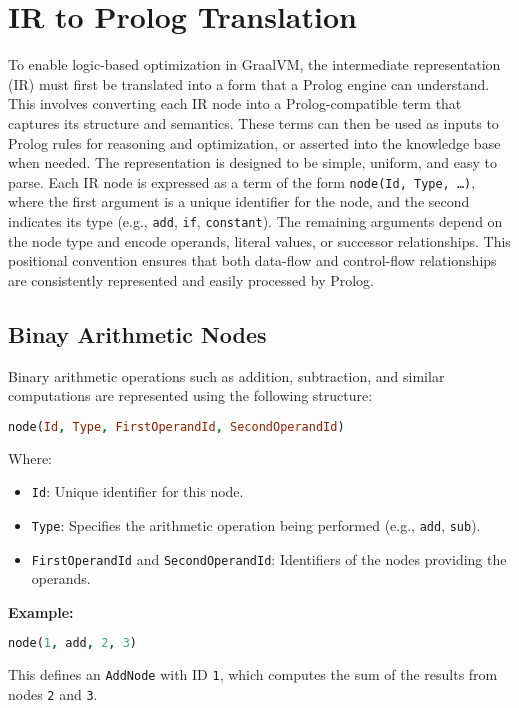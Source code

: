 \section{IR to Prolog Translation}
To enable logic-based optimization in GraalVM, the intermediate representation (IR) must first be translated into a form that a Prolog engine can understand. This involves converting each IR node into a Prolog-compatible term that captures its structure and semantics. These terms can then be used as inputs to Prolog rules for reasoning and optimization, or asserted into the knowledge base when needed.
The representation is designed to be simple, uniform, and easy to parse. Each IR node is expressed as a term of the form \texttt{node(Id, Type, \ldots)}, where the first argument is a unique identifier for the node, and the second indicates its type (e.g., \texttt{add}, \texttt{if}, \texttt{constant}). The remaining arguments depend on the node type and encode operands, literal values, or successor relationships. This positional convention ensures that both data-flow and control-flow relationships are consistently represented and easily processed by Prolog.

\subsection*{Binay Arithmetic Nodes}
Binary arithmetic operations such as addition, subtraction, and similar computations are represented using the following structure:

\begin{lstlisting}[language=Prolog]
node(Id, Type, FirstOperandId, SecondOperandId)
\end{lstlisting}

Where:
\begin{itemize}
\item \texttt{Id}: Unique identifier for this node.
\item \texttt{Type}:  Specifies the arithmetic operation being performed (e.g., \texttt{add}, \texttt{sub}).
\item \texttt{FirstOperandId} and \texttt{SecondOperandId}: Identifiers of the nodes providing the operands.
\end{itemize}

\textbf{Example:}
\begin{lstlisting}[language=Prolog]
node(1, add, 2, 3)
\end{lstlisting}
This defines an \texttt{AddNode} with ID \texttt{1}, which computes the sum of the results from nodes \texttt{2} and \texttt{3}.


